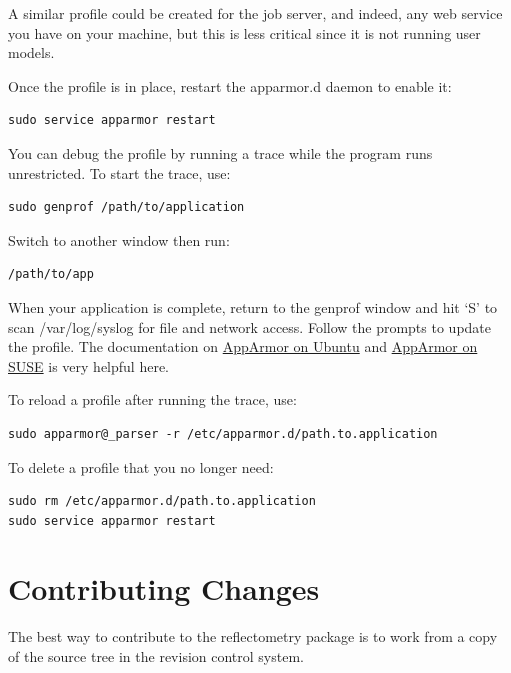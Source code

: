 \documentclass[letterpaper,10pt,english]{sphinxmanual}
\begin{document}
A similar profile could be created for the job server, and indeed, any web
service you have on your machine, but this is less critical since it is not
running user models.

Once the profile is in place, restart the apparmor.d daemon to enable it:

\begin{Verbatim}[commandchars=@\[\]]
sudo service apparmor restart
\end{Verbatim}

You can debug the profile by running a trace while the program runs
unrestricted.  To start the trace, use:

\begin{Verbatim}[commandchars=@\[\]]
sudo genprof /path/to/application
\end{Verbatim}

Switch to another window then run:

\begin{Verbatim}[commandchars=@\[\]]
/path/to/app
\end{Verbatim}

When your application is complete, return to the genprof window
and hit `S' to scan /var/log/syslog for file and network access.
Follow the prompts to update the profile.  The documentation on
\href{https://help.ubuntu.com/community/AppArmor}{AppArmor on Ubuntu}
and
\href{http://doc.opensuse.org/products/opensuse/openSUSE/opensuse-security/cha.apparmor.profiles.html}{AppArmor on SUSE}
is very helpful here.

To reload a profile after running the trace, use:

\begin{Verbatim}[commandchars=@\[\]]
sudo apparmor@_parser -r /etc/apparmor.d/path.to.application
\end{Verbatim}

To delete a profile that you no longer need:

\begin{Verbatim}[commandchars=@\[\]]
sudo rm /etc/apparmor.d/path.to.application
sudo service apparmor restart
\end{Verbatim}


\section{Contributing Changes}
\label{getting_started/contributing:contributing}\label{getting_started/contributing:contributing-changes}\label{getting_started/contributing::doc}
The best way to contribute to the reflectometry package is to work
from a copy of the source tree in the revision control system.
\end{document}
